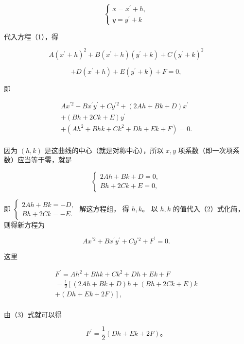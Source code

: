 \[
\left\{ \begin{array}{l} x = x^{\prime} + h, \\ y = y^{\prime} + k \end{array} \right.
\]

代入方程（1），得

\[
A \left(x^{\prime} + h\right) ^ {2} + B \left(x^{\prime} + h\right) \left(y^{\prime} + k\right) + C \left(y^{\prime} + k\right) ^ {2}
\]

\[
+ D \left(x^{\prime} + h\right) + E \left(y^{\prime} + k\right) + F = 0,
\]

即

\[
\begin{array}{l} A x^{\prime 2} + B x^{\prime} y^{\prime} + C y^{\prime 2} + (2 A h + B k + D) x^{\prime} \\ + (B h + 2 C k + E) y^{\prime} \\ + (A h^{2} + B h k + C k^{2} + D h + E k + F) = 0. \tag {2} \\ \end{array}
\]

因为 \((h, k)\) 是这曲线的中心（就是对称中心），所以 \(x, y\)
项系数（即一次项系数）应当等于零，就是

\[
\left\{ \begin{array}{l} 2 A h + B k + D = 0, \\ B h + 2 C k + E = 0, \end{array} \right. \tag {3}
\]

即
\(\left\{ \begin{array}{l} 2Ah + Bk = -D, \\ Bh + 2Ck = -E. \end{array} \right.\)
解这方程组， 得 \(h, k\)。 以 \(h, k\) 的值代入（2）式化简，
则得新方程为

\[
A x^{\prime 2} + B x^{\prime} y^{\prime} + C y^{\prime 2} + F^{\prime} = 0. \tag {4}
\]

这里

\[
\begin{array}{l} F^{\prime} = A h^{2} + B h k + C k^{2} + D h + E k + F \\ = \frac {1}{2} \left[ (2 A h + B k + D) h + (B h + 2 C k + E) k \right. \\ \left. + (D h + E k + 2 F) \right], \\ \end{array}
\]

由（3）式就可以得

\[
F^{\prime} = \frac {1}{2} (D h + E k + 2 F)\text{。} \tag {5}
\]

